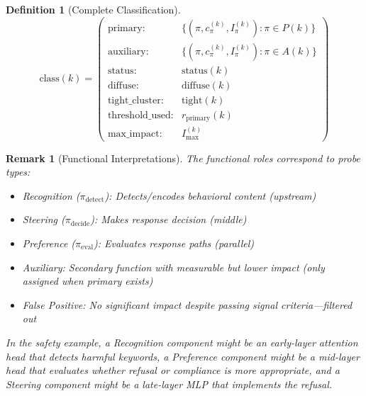 \documentclass[11pt]{article}
\newtheorem{definition}{Definition}[section]
\newtheorem{remark}{Remark}[section]
\begin{document}
\begin{definition}[Complete Classification]
\label{def:complete-classification}
\begin{equation}
\text{class}(k) = \begin{pmatrix}
\text{primary}: & \{(\pi, c^{(k)}_\pi, I^{(k)}_\pi) : \pi \in P(k)\} \\
\text{auxiliary}: & \{(\pi, c^{(k)}_\pi, I^{(k)}_\pi) : \pi \in A(k)\} \\
\text{status}: & \text{status}(k) \\
\text{diffuse}: & \text{diffuse}(k) \\
\text{tight\_cluster}: & \text{tight}(k) \\
\text{threshold\_used}: & r_{\text{primary}}(k) \\
\text{max\_impact}: & I_{\max}^{(k)}
\end{pmatrix}
\end{equation}
\end{definition}

\begin{remark}[Functional Interpretations]
\label{rem:functional-interpretations}
The functional roles correspond to probe types:
\begin{itemize}[nosep]
\item Recognition ($\pi_{\text{detect}}$): Detects/encodes behavioral content (upstream)
\item Steering ($\pi_{\text{decide}}$): Makes response decision (middle)
\item Preference ($\pi_{\text{eval}}$): Evaluates response paths (parallel)
\item Auxiliary: Secondary function with measurable but lower impact (only assigned when primary exists)
\item False Positive: No significant impact despite passing signal criteria---filtered out
\end{itemize}
In the safety example, a Recognition component might be an early-layer attention head that detects harmful keywords, a Preference component might be a mid-layer head that evaluates whether refusal or compliance is more appropriate, and a Steering component might be a late-layer MLP that implements the refusal.
\end{remark}
\end{document}
